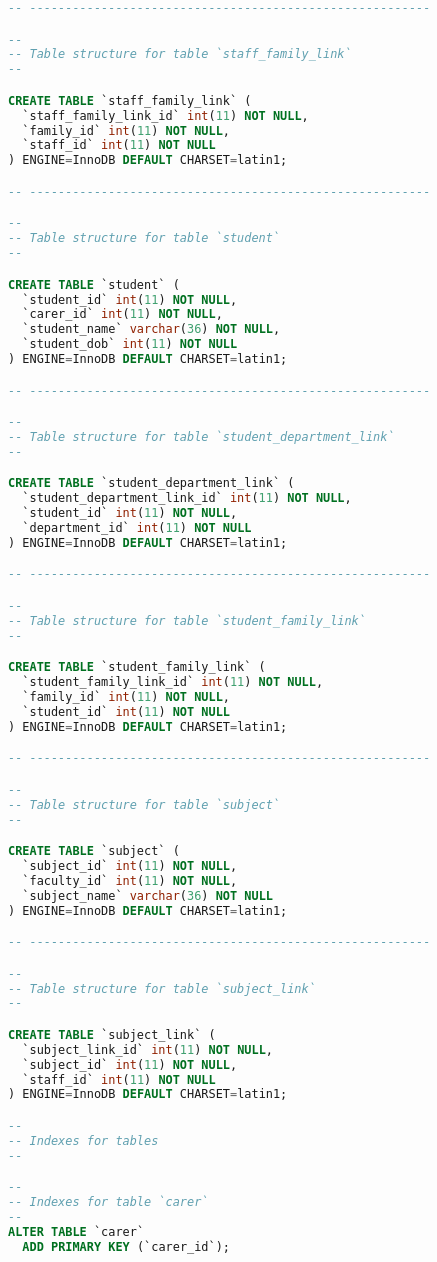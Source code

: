 \begin{lstlisting}[language=sql, caption=Database Generation Script, style=mystyle]
-- --------------------------------------------------------

--
-- Table structure for table `staff_family_link`
--

CREATE TABLE `staff_family_link` (
  `staff_family_link_id` int(11) NOT NULL,
  `family_id` int(11) NOT NULL,
  `staff_id` int(11) NOT NULL
) ENGINE=InnoDB DEFAULT CHARSET=latin1;

-- --------------------------------------------------------

--
-- Table structure for table `student`
--

CREATE TABLE `student` (
  `student_id` int(11) NOT NULL,
  `carer_id` int(11) NOT NULL,
  `student_name` varchar(36) NOT NULL,
  `student_dob` int(11) NOT NULL
) ENGINE=InnoDB DEFAULT CHARSET=latin1;

-- --------------------------------------------------------

--
-- Table structure for table `student_department_link`
--

CREATE TABLE `student_department_link` (
  `student_department_link_id` int(11) NOT NULL,
  `student_id` int(11) NOT NULL,
  `department_id` int(11) NOT NULL
) ENGINE=InnoDB DEFAULT CHARSET=latin1;

-- --------------------------------------------------------

--
-- Table structure for table `student_family_link`
--

CREATE TABLE `student_family_link` (
  `student_family_link_id` int(11) NOT NULL,
  `family_id` int(11) NOT NULL,
  `student_id` int(11) NOT NULL
) ENGINE=InnoDB DEFAULT CHARSET=latin1;

-- --------------------------------------------------------

--
-- Table structure for table `subject`
--

CREATE TABLE `subject` (
  `subject_id` int(11) NOT NULL,
  `faculty_id` int(11) NOT NULL,
  `subject_name` varchar(36) NOT NULL
) ENGINE=InnoDB DEFAULT CHARSET=latin1;

-- --------------------------------------------------------

--
-- Table structure for table `subject_link`
--

CREATE TABLE `subject_link` (
  `subject_link_id` int(11) NOT NULL,
  `subject_id` int(11) NOT NULL,
  `staff_id` int(11) NOT NULL
) ENGINE=InnoDB DEFAULT CHARSET=latin1;

--
-- Indexes for tables
--

--
-- Indexes for table `carer`
--
ALTER TABLE `carer`
  ADD PRIMARY KEY (`carer_id`);


\end{lstlisting}
